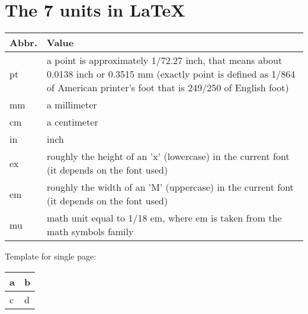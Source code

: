 \documentclass[openany]{book}
\begin{document}
\chapter{The 7 units in LaTeX}
\begin{center}
\begin{tabular}{l|m{6cm}}
\textbf{Abbr.} & \textbf{Value} \\\hline
pt & a point is approximately 1/72.27 inch, that means about 0.0138 inch or 0.3515 mm (exactly point is defined as 1/864 of American printer’s foot that is 249/250 of English foot) \\\hline
mm & a millimeter \\\hline
cm & a centimeter \\\hline
in & inch \\\hline
ex & roughly the height of an 'x' (lowercase) in the current font (it depends on the font used) \\\hline
em & roughly the width of an 'M' (uppercase) in the current font (it depends on the font used) \\\hline
mu & math unit equal to 1/18 em, where em is taken from the math symbols family \\
\end{tabular}
\end{center}
\clearpage %

Template for single page:
\begin{center}
\begin{tabular}{l|l}
\textbf{a} & \textbf{b} \\\hline
c & d \\
\end{tabular}
\end{center}
\clearpage %
\end{document}
